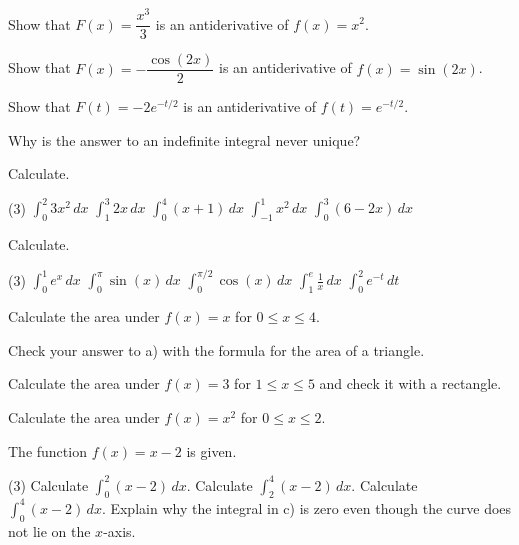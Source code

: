 \begin{parts}
  \item Show that $F(x) = \dfrac{x^3}{3}$ is an antiderivative of $f(x) = x^2$.
  \item Show that $F(x) = -\dfrac{\cos(2x)}{2}$ is an antiderivative of $f(x) = \sin(2x)$.
  \item Show that $F(t) = -2e^{-t/2}$ is an antiderivative of $f(t) = e^{-t/2}$.
  \item Why is the answer to an indefinite integral never unique?
\end{parts}

Calculate.
\begin{delar}(3)
  \task $\displaystyle\int_0^2 3x^2\,dx$
  \task $\displaystyle\int_1^3 2x\,dx$
  \task $\displaystyle\int_0^4 (x + 1)\,dx$
  \task $\displaystyle\int_{-1}^{1} x^2\,dx$
  \task $\displaystyle\int_0^3 (6 - 2x)\,dx$
\end{delar}

Calculate.
\begin{delar}(3)
  \task $\displaystyle\int_0^1 e^x\,dx$
  \task $\displaystyle\int_0^{\pi} \sin(x)\,dx$
  \task $\displaystyle\int_0^{\pi/2} \cos(x)\,dx$
  \task $\displaystyle\int_1^{e} \frac{1}{x}\,dx$
  \task $\displaystyle\int_0^2 e^{-t}\,dt$
\end{delar}

\begin{parts}
  \item Calculate the area under $f(x) = x$ for $0 \leq x \leq 4$.
  \item Check your answer to a) with the formula for the area of a triangle.
  \item Calculate the area under $f(x) = 3$ for $1 \leq x \leq 5$ and check it with a rectangle.
  \item Calculate the area under $f(x) = x^2$ for $0 \leq x \leq 2$.
\end{parts}

The function $f(x) = x - 2$ is given.
\begin{delar}(3)
  \task Calculate $\displaystyle\int_0^2 (x - 2)\,dx$.
  \task Calculate $\displaystyle\int_2^4 (x - 2)\,dx$.
  \task Calculate $\displaystyle\int_0^4 (x - 2)\,dx$.
  \task* Explain why the integral in c) is zero even though the curve does not lie on the
    $x$-axis.
\end{delar}

